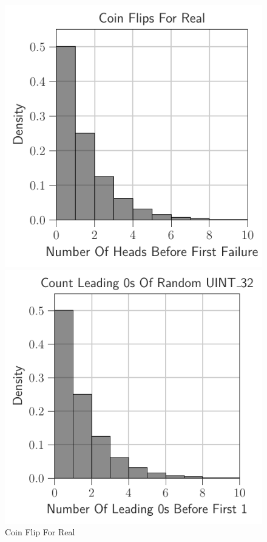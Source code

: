 \documentclass{article}
\begin{document}
\begin{figure}[H]
    \centering
    \begin{minipage}{0.32\textwidth}
        \centering
        \includegraphics[width=\linewidth]{../notebook/plot/coin_flips_for_real.pdf}
        \caption*{Coin Flip For Real}
    \end{minipage}\hfill
    \begin{minipage}{0.32\textwidth}
        \centering
        \includegraphics[width=\linewidth]{../notebook/plot/count_leading_0s_of_random_uint_32.pdf}

\end{minipage}
\end{figure}
\end{document}
